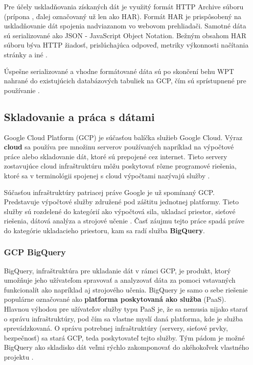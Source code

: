 Pre účely uskladňovania získaných dát je využitý formát HTTP Archive súboru (prípona , ďalej označovaný už len ako HAR).
Formát HAR je prispôsobený na uskladňovanie dát spojenia nadviazanom vo webovom prehliadači. Samotné dáta sú serializované ako JSON - JavaScript Object Notation.
Bežným obsahom HAR súboru býva HTTP žiadosť, prislúchajúca odpoveď, metriky výkonnosti načítania stránky a iné \cite{httparchive-harfile}.



Úspešne serializované a vhodne formátované dáta sú po skončení behu WPT nahrané do existujúcich databázových tabuliek na GCP, čím sú sprístupnené pre používanie \cite{httparchive-faq}. 

\subsection{Skladovanie a práca s dátami}
Google Cloud Platform (GCP) je súčasťou balíčka služieb Google Cloud. 
Výraz \textbf{cloud} sa používa pre množinu serverov používaných napríklad na výpočtové práce alebo skladovanie dát, ktoré sú prepojené cez internet.
Tieto servery zostavujúce cloud infraštruktúru môžu poskytovať rôzne programové riešenia, ktoré sa v terminológii spojenej s cloud výpočtami nazývajú služby \cite{cloudflare-clouddefinition}.

Súčasťou infraštruktúry patriacej práve Google je už spomínaný GCP. Predstavuje výpočtové služby združené pod záštitu jednotnej platformy.
Tieto služby sú rozdelené do kategórií ako výpočtová sila, ukladací priestor, sieťové riešenia, dátová analýza a strojové učenie \cite{gfg-gcp}.
Časť záujmu tejto práce spadá práve do kategórie ukladacieho priestoru, kam sa radí služba \textbf{BigQuery}.

\subsubsection{GCP BigQuery}

BigQuery, infraštruktúra pre ukladanie dát v rámci GCP, je produkt, ktorý umožňuje jeho užívateľom spravovať a analyzovať dáta za pomoci vstavaných funkcionalít ako napríklad aj strojového učenia.
BigQuery je samo o sebe riešenie populárne označované ako \textbf{platforma poskytovaná ako služba} (PaaS).
Hlavnou výhodou pre užívateľov služby typu PaaS je, že sa nemusia nijako starať o správu infraštruktúry, pod čím sa vlastne myslí daná platforma, kde je služba sprevádzkovaná.
O správu potrebnej infraštruktúry (servery, sieťové prvky, bezpečnosť) sa stará GCP, teda poskytovateľ tejto služby.
Tým pádom je možné BigQuery ako skladisko dát veľmi rýchlo zakomponovať do akéhokoľvek vlastného projektu \cite{google-bq}.

